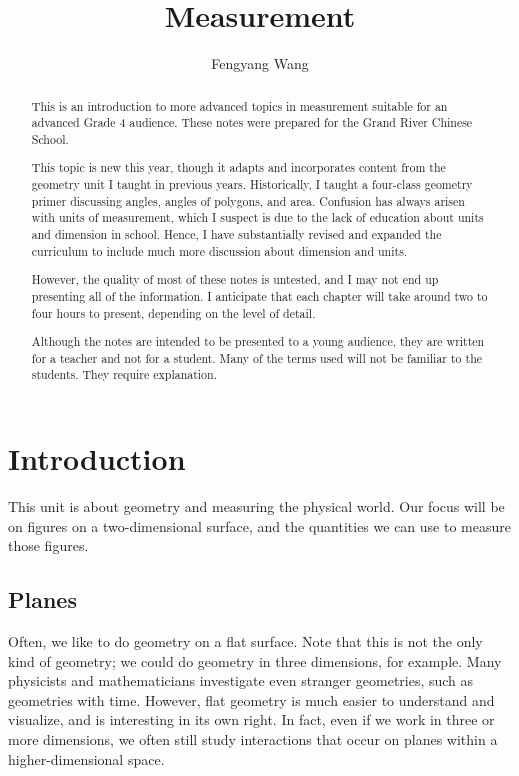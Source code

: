 \documentclass[a4paper,10pt]{report}
\title{Measurement}
\author{Fengyang Wang}
\begin{document}
\begin{abstract}
 This is an introduction to more advanced topics in measurement suitable for an
 advanced Grade 4 audience. These notes were prepared for the Grand River
 Chinese School.

 This topic is new this year, though it adapts and incorporates content from the
 geometry unit I taught in previous years. Historically, I taught a four-class
 geometry primer discussing angles, angles of polygons, and area. Confusion has
 always arisen with units of measurement, which I suspect is due to the lack of
 education about units and dimension in school. Hence, I have substantially
 revised and expanded the curriculum to include much more discussion about
 dimension and units.

 However, the quality of most of these notes is untested, and I may not end up
 presenting all of the information. I anticipate that each chapter will take
 around two to four hours to present, depending on the level of detail.

 Although the notes are intended to be presented to a young audience, they are
 written for a teacher and not for a student. Many of the terms used will not be
 familiar to the students. They require explanation.
\end{abstract}

\maketitle

\tableofcontents

\chapter{Introduction}

This unit is about geometry and measuring the physical world. Our focus will be
on figures on a two-dimensional surface, and the quantities we can use to
measure those figures.

\section{Planes}

Often, we like to do geometry on a flat surface. Note that this is not the only
kind of geometry; we could do geometry in three dimensions, for example. Many
physicists and mathematicians investigate even stranger geometries, such as
geometries with time. However, flat geometry is much easier to understand and
visualize, and is interesting in its own right. In fact, even if we work in
three or more dimensions, we often still study interactions that occur on planes
within a higher-dimensional space.
\end{document}
